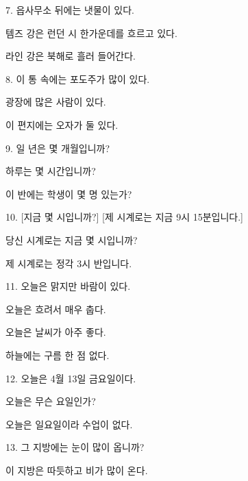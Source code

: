 \begin{problem}{7. }
    읍사무소 뒤에는 냇물이 있다.

    템즈 강은 런던 시 한가운데를 흐르고 있다.

    라인 강은 북해로 흘러 들어간다.
    \vspace{1pc}
\end{problem}

\begin{problem}{8. }
    이 통 속에는 포도주가 많이 있다.

    광장에 많은 사람이 있다.

    이 편지에는 오자가 둘 있다.
    \vspace{1pc}
\end{problem}

\begin{problem}{9. }
    일 년은 몇 개월입니까?

    하루는 몇 시간입니까?

    이 반에는 학생이 몇 명 있는가?
    \vspace{1pc}
\end{problem}

\begin{problem}{10. }
    [지금 몇 시입니까?] [제 시계로는 지금 9시 15분입니다.]

    당신 시계로는 지금 몇 시입니까?

    제 시계로는 정각 3시 반입니다.
    \vspace{1pc}
\end{problem}

\begin{problem}{11. }
    오늘은 맑지만 바람이 있다.

    오늘은 흐려서 매우 춥다.

    오늘은 날씨가 아주 좋다.

    하늘에는 구름 한 점 없다.
    \vspace{1pc}
\end{problem}

\begin{problem}{12. }
    오늘은 4월 13일 금요일이다.

    오늘은 무슨 요일인가?

    오늘은 일요일이라 수업이 없다.
    \vspace{1pc}
\end{problem}

\begin{problem}{13. }
    그 지방에는 눈이 많이 옵니까?

    이 지방은 따듯하고 비가 많이 온다.
    \vspace{1pc}
\end{problem}

